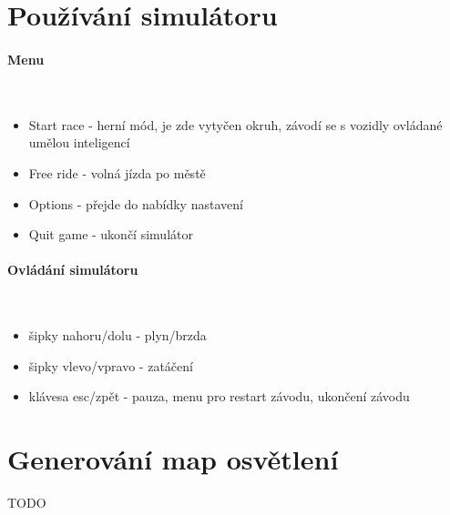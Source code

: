 \documentclass[11pt,twoside,a4paper]{book}
\begin{document}
\section{Používání simulátoru}
\paragraph{Menu}\ \ \\
\begin{itemize}
\item Start race - herní mód, je zde vytyčen okruh, závodí se s vozidly ovládané umělou inteligencí
\item Free ride - volná jízda po městě
\item Options - přejde do nabídky nastavení
\item Quit game - ukončí simulátor
\end{itemize}

\paragraph{Ovládání simulátoru}\ \ \\
\begin{itemize}
\item šipky nahoru/dolu - plyn/brzda
\item šipky vlevo/vpravo - zatáčení
\item klávesa esc/zpět - pauza, menu pro restart závodu, ukončení závodu
\end{itemize}

\section{Generování map osvětlení}
TODO
\end{document}
